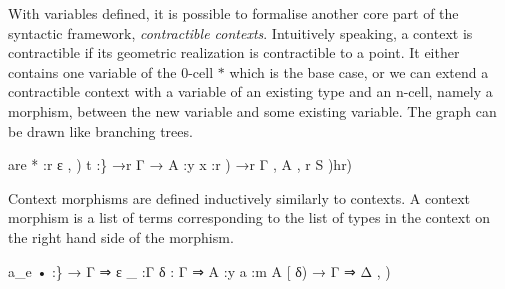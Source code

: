 \documentclass{acm_proc_article-sp}
\begin{document}
{\begin{code}
\<%
\end{code}
}
With variables defined, it is possible to formalise another core part of the syntactic framework, \emph{contractible
contexts}. Intuitively speaking, a context is contractible if its geometric
realization is contractible to a point. It either contains one variable of the 0-cell $*$ which is the base case, or we can extend a contractible context with a
variable of an existing type and an n-cell, namely a morphism, between the new variable and some existing variable. The graph can be drawn like branching trees.

\begin{code}%
\>are
 *   :r \AgdaInductiveConstructor{(}ε , \AgdaSymbol{*})
 t  :\AgdaBound{\{}\} →r Γ → \AgdaBound{\{}A :y \AgdaBound{(}x :r ) 
       →r \AgdaBound{(}Γ , A , r S )\AgdaInductiveConstructor{ =}hr)     
\<%
\end{code}
Context morphisms are defined inductively similarly to contexts. A context morphism is a list of terms corresponding to the list of types in the context on the right hand side of the morphism.

\begin{code}%
\>a\_e
  •    :\AgdaBound{\{}\} → Γ ⇒ ε
 \AgdaInductiveConstructor{ \_,}\_  :\AgdaBound{\{}Γ \AgdaBound{(}δ : Γ ⇒ \AgdaBound{\{}A :y \AgdaBound{(}a :m \AgdaBound{(}A [ δ\AgdaFunction{ ]})
       → Γ ⇒ \AgdaBound{(}Δ , )
\<%
\end{code}
\end{document}
